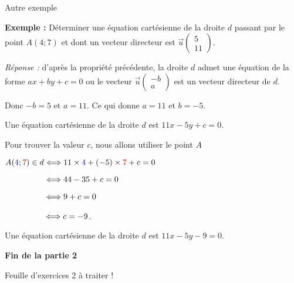 \documentclass[12pt]{beamer}
\begin{document}
\begin{frame}{Autre exemple}

\textbf{Exemple :} Déterminer une équation cartésienne de la droite $d$ passant par le point $A(4;7)$ et dont un vecteur directeur est $\overrightarrow{u} \begin{pmatrix} 5 \\ 11 \end{pmatrix}$.

\bigskip

\textit{Réponse : } d'après la propriété précédente, la droite $d$ admet une équation de la forme $ax+by+c = 0$ ou le vecteur $\overrightarrow{u} \begin{pmatrix} -b \\ a \end{pmatrix}$ est un vecteur directeur de $d$. 

\medskip

Donc $-b = 5$ et $a = 11$. Ce qui donne $a=11$ et $b = -5$.

\end{frame}

\begin{frame}
Une équation cartésienne de la droite $d$ est $11x-5y+c = 0$.

\bigskip

Pour trouver la valeur $c$, nous allons utiliser le point $A$

\bigskip

$A(\textcolor{blue}{4};\textcolor{red}{7}) \in d \Longleftrightarrow 11 \times \textcolor{blue}{4} + (-5) \times \textcolor{red}{7} + c = 0$ \par  
$\phantom{A(\textcolor{blue}{4};\textcolor{red}{7}) \in d} \Longleftrightarrow 44 -35 + c = 0$ \par 
$\phantom{A(\textcolor{blue}{4};\textcolor{red}{7}) \in d} \Longleftrightarrow 9 + c = 0$ \par 
$\phantom{A(\textcolor{blue}{4};\textcolor{red}{7}) \in d} \Longleftrightarrow c = -9$.


\bigskip

Une équation cartésienne de la droite $d$ est $11x-5y - 9 =0 $.

\end{frame}

\begin{frame}
\begin{center}
\textbf{Fin de la partie 2}
\end{center}

Feuille d'exercices 2 à traiter !
\end{frame}
\end{document}
